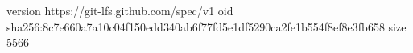 version https://git-lfs.github.com/spec/v1
oid sha256:8c7e660a7a10c04f150edd340ab6f77fd5e1df5290ca2fe1b554f8ef8e3fb658
size 5566

